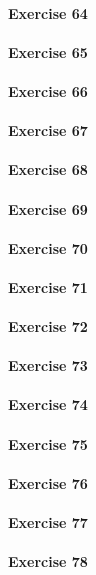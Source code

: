 \paragraph{Exercise 64}
\paragraph{Exercise 65}
\paragraph{Exercise 66}
\paragraph{Exercise 67}
\paragraph{Exercise 68}
\paragraph{Exercise 69}
\paragraph{Exercise 70}
\paragraph{Exercise 71}
\paragraph{Exercise 72}
\paragraph{Exercise 73}
\paragraph{Exercise 74}
\paragraph{Exercise 75}
\paragraph{Exercise 76}
\paragraph{Exercise 77}
\paragraph{Exercise 78}
